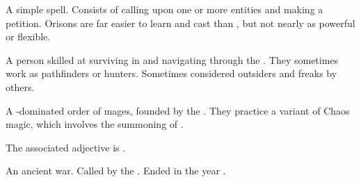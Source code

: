 \begin{gloss}
\begin{comment}
\paragraph{orison}
\end{comment}
A simple spell. 
Consists of calling upon one or more entities and making a petition. 
Orisons are far easier to learn and cast than , but not nearly as powerful or flexible. 







\begin{comment}
\paragraph{\ranger}
\end{comment}
\gitem{\ranger}
\index{\ranger}
A person skilled at surviving in and navigating through the \Wylde{}. 
They sometimes work as pathfinders or hunters. 
Sometimes considered outsiders and freaks by others. 







\begin{comment}
\paragraph{\rethyax}
\end{comment}
\gitem[\rethyaxes]{\rethyax}
A -dominated order of mages, founded by the . 
They practice a variant of Chaos magic, which involves the summoning of . 

The associated adjective is \quo{\rethyactic}. 
\also{\Ortaica}







\begin{comment}
\paragraph{\Secondbanewar}
\end{comment}
\gitem{\Secondbanewar}
An ancient war.
Called  by the \resphain. 
Ended in the year . 








\end{gloss}
